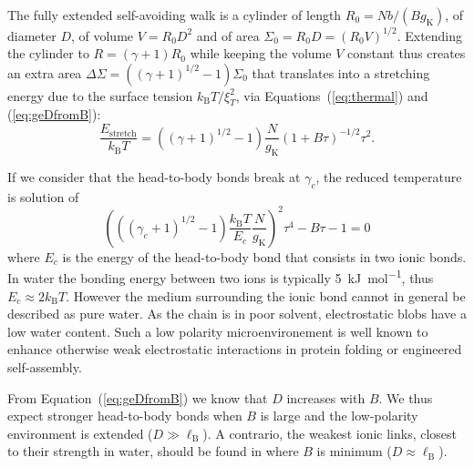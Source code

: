 \documentclass[twoside,twocolumn,9pt]{article}
\begin{document}
The fully extended self-avoiding walk is a cylinder of length $R_0 = Nb/(Bg_\mathrm{K})$, of diameter $D$, of volume $V = R_0 D^2$ and of area $\Sigma_0 = R_0 D = (R_0 V)^{1/2}$. Extending the cylinder to $R = (\gamma+1) R_0$ while keeping the volume $V$ constant thus creates an extra area 
$
\Delta\Sigma = \left(\left(\gamma +1\right)^{1/2} -1\right) \Sigma_0
$
that translates into a stretching energy due to the surface tension $k_\mathrm{B}T/\xi_T^2$, via Equations~(\ref{eq:thermal}) and (\ref{eq:geDfromB}):
\begin{equation}
\frac{E_\mathrm{stretch}}{k_\mathrm{B}T} = \left(\left(\gamma +1\right)^{1/2} -1\right) \frac{N}{g_\mathrm{K}} (1+B\tau)^{-1/2} \tau^2.
\label{eq:stretch}
\end{equation}

If we consider that the head-to-body bonds break at $\gamma_c$, the reduced temperature is solution of
\begin{equation}
\left(\left((\gamma_c +1)^{1/2} -1\right)\frac{k_\mathrm{B}T}{E_c}\frac{N}{g_\mathrm{K}}\right)^2 \tau^4 - B\tau -1 = 0
\label{eq:tau}
\end{equation}
where $E_c$ is the energy of the head-to-body bond that consists in two ionic bonds. In water the bonding energy between two ions is typically \SI{5}{\kilo\joule\per\mole}\cite{Schneider1992}, thus $E_c\approx 2 k_\mathrm{B}T$. However the medium surrounding the ionic bond cannot in general be described as pure water. As the chain is in poor solvent, electrostatic blobs have a low water content. Such a low polarity microenvironement is well known to enhance otherwise weak electrostatic interactions in protein folding or engineered self-assembly\cite{Rehm2010}.

From Equation~(\ref{eq:geDfromB}) we know that $D$ increases with $B$. We thus expect stronger head-to-body bonds when $B$ is large and the low-polarity environment is extended ($D\gg\ell_\mathrm{B}$). A contrario, the weakest ionic links, closest to their strength in water, should be found in  where $B$ is minimum ($D\approx\ell_\mathrm{B}$).
\end{document}
